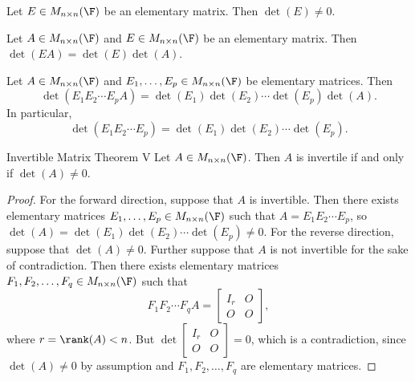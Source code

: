 \documentclass[linearalgebraI]{subfiles}
\begin{document}
    \begin{cor}{}
        Let $E\in M_{n\times n}(\F)$ be an elementary matrix. Then $\det(E)\neq 0$.
    \end{cor}	

    \begin{cor}{}
        Let $A\in M_{n\times n}(\F)$ and $E\in M_{n\times n}(\F)$ be an elementary matrix. Then $\det \left( EA \right) = \det(E) \det(A)$.
    \end{cor}	

    \begin{cor}{}
        Let $A\in M_{n\times n}(\F)$ and $E_1, \ldots, E_p\in M_{n\times n}(\F)$ be elementary matrices. Then 
        \begin{equation*}
            \det \left( E_1E_2\cdots E_pA \right) = \det(E_1) \det(E_2) \cdots \det(E_p) \det(A).
        \end{equation*}
        In particular,
        \begin{equation*}
            \det \left( E_1E_2\cdots E_p \right) = \det(E_1) \det(E_2) \cdots \det(E_p).
        \end{equation*}
    \end{cor}	

    \begin{theorem}{Invertible Matrix Theorem V}
        Let $A\in M_{n\times n}(\F)$. Then $A$ is invertile if and only if $\det(A)\neq 0$.
    \end{theorem}

    \begin{proof}
        For the forward direction, suppose that $A$ is invertible. Then there exists elementary matrices $E_1, \ldots, E_p\in M_{n\times n}(\F)$ such that $A = E_1E_2\cdots E_p$, so $\det(A) = \det(E_1) \det(E_2) \cdots \det(E_p) \neq 0$. For the reverse direction, suppose that $\det(A)\neq 0$. Further suppose that $A$ is not invertible for the sake of contradiction. Then there exists elementary matrices $F_1, F_2, \ldots, F_q\in M_{n\times n}(\F)$ such that
        \begin{equation*}
            F_1F_2\cdots F_qA = 
            \begin{bmatrix}
                I_r & O \\ O & O
            \end{bmatrix},
        \end{equation*}
        where $r = \rank(A) < n$. But $\det \begin{bmatrix} I_r & O \\ O & O \end{bmatrix} = 0$, which is a contradiction, since $\det(A)\neq 0$ by assumption and $F_1, F_2, \ldots, F_q$ are elementary matrices.
    \end{proof}
\end{document}
